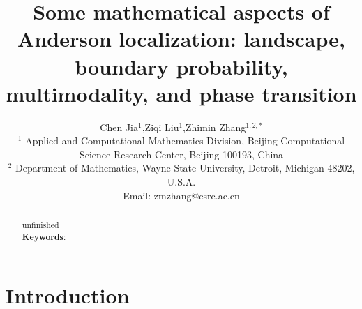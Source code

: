 \documentclass[a4paper,11pt]{article}
\newcommand{\paperfont}{\fontsize{11pt}{1.2\baselineskip}\selectfont}
\begin{document}
\theoremstyle{definition}
\makeatletter
\thm@headfont{\bf}
\makeatother
\newtheorem{definition}{Definition}
\newtheorem{example}{Example}
\newtheorem{theorem}{Theorem}
\newtheorem{lemma}{Lemma}
\newtheorem{corollary}{Corollary}
\newtheorem{remark}{Remark}
\newtheorem{proposition}{Proposition}

\lhead{}
\rhead{}
\lfoot{}
\rfoot{}

\renewcommand{\refname}{References}
\renewcommand{\figurename}{Fig.}
\renewcommand{\tablename}{Table}
\renewcommand{\proofname}{Proof}

\newcommand{\diag}{\mathrm{diag}}
\newcommand{\tr}{\mathrm{tr}}
\newcommand{\dnum}{\mathrm{d}}
\newcommand{\Enum}{\mathbb{E}}
\newcommand{\Pnum}{\mathbb{P}}
\newcommand{\Rnum}{\mathbb{R}}
\newcommand{\Cnum}{\mathbb{C}}
\newcommand{\Znum}{\mathbb{Z}}
\newcommand{\Nnum}{\mathbb{N}}
\newcommand{\abs}[1]{\left\vert#1\right\vert}
\newcommand{\set}[1]{\left\{#1\right\}}
\newcommand{\norm}[1]{\left\Vert#1\right\Vert}
\newcommand{\Q}{\boldsymbol{Q}}
\newcommand{\W}{\boldsymbol{W}}
\newcommand{\I}{\boldsymbol{I}}
\newcommand{\M}{\boldsymbol{M}}
\newcommand{\p}{\boldsymbol{p}}
\newcommand{\pai}{\boldsymbol{\pi}}

\title{\textbf{Some mathematical aspects of Anderson localization: landscape, boundary probability, multimodality, and phase transition}}
\author{Chen Jia$^{1}$,\;\;\;Ziqi Liu$^{1}$,\;\;\;Zhimin Zhang$^{1,2,*}$\\
\footnotesize $^1$ Applied and Computational Mathematics Division, Beijing Computational Science Research Center, Beijing 100193, China \\
\footnotesize $^2$ Department of Mathematics, Wayne State University, Detroit, Michigan 48202, U.S.A.\\
\footnotesize Email: zmzhang@csrc.ac.cn}
\date{}
\maketitle
\thispagestyle{empty}

\paperfont

\begin{abstract}
{\color{red} unfinished} \\

\noindent
\textbf{Keywords}:

\end{abstract}

\section{Introduction}
\end{document}
